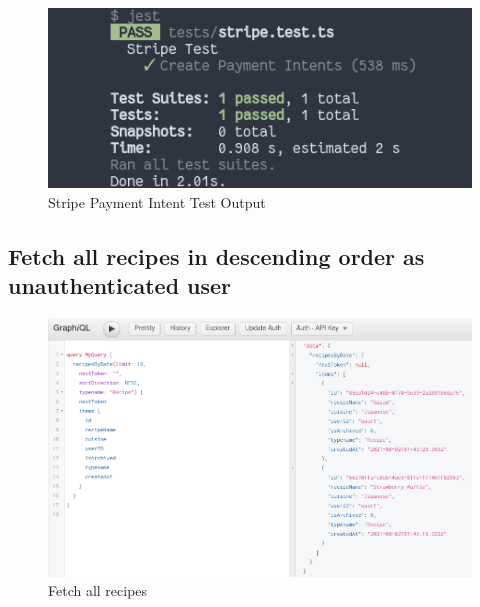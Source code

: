 \begin{figure}[!hb]
\centering
\caption[Stripe Payment Intent Test Output]{Stripe Payment Intent Test Output}%
\label{fig:stripe_payment_intent_test_output}
\includegraphics[width=\linewidth,height=\textheight,keepaspectratio]{img/stripe_payment_intent_test_output}
\end{figure}

\clearpage

\subsection{Fetch all recipes in descending order as unauthenticated user} 

\begin{figure}[!hb]
\centering
\caption[Fetch all recipes]{Fetch all recipes}%
\label{fig:fetch_recipes}
\includegraphics[width=\linewidth,height=\textheight,keepaspectratio]{img/fetch_recipes.png}
\end{figure}

